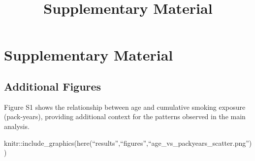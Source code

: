 \documentclass[
  letterpaper,
  DIV=11,
  numbers=noendperiod]{scrartcl}
\title{Supplementary Material}
\author{}
\date{}
\begin{document}
\maketitle


\section{Supplementary Material}\label{supplementary-material}

\subsection{Additional Figures}\label{additional-figures}

Figure S1 shows the relationship between age and cumulative smoking
exposure (pack-years), providing additional context for the patterns
observed in the main analysis.

knitr::include\_graphics(here(``results'',``figures'',``age\_vs\_packyears\_scatter.png''))
\end{document}
